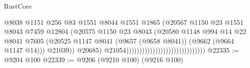 \begin{lexlean}{RustCore}
\begin{coremodule}
                                                                @8038
                                                                @1151
                                                                @256
                                                                @83
                                                                @1551
                                                                @8044
                                                                @1551
                                                                @1865
                                                                (@20567
                                                                  @1150
                                                                  @23
                                                                  @1551
                                                                  @8043
                                                                  @7459
                                                                  @12804
                                                                  (@20575
                                                                    @1150
                                                                    @23
                                                                    @8043
                                                                    (@20580
                                                                      @1148
                                                                      @994
                                                                      @14
                                                                      @22
                                                                      @8041
                                                                      @7605
                                                                      (@20525
                                                                        @1147
                                                                        @8041
                                                                        (@9657 (@9658 @8041))
                                                                        (@9662 (@9664 @1147 @14)))
                                                                      @21039))
                                                                  @20685)
                                                                @21054))))))))))))))))))))))))))))))
@22335 := @9204 @100
@22339 := @9206 (@9210 @100) (@9216 @100)

\end{coremodule}
\end{lexlean}
